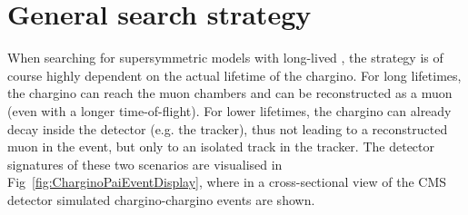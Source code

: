 \section{General search strategy}
\label{sec:GeneralSearchStrategy}

When searching for supersymmetric models with long-lived \chipm, the strategy is of course highly dependent on the actual lifetime of the chargino. 
For long lifetimes, the chargino can reach the muon chambers and can be reconstructed as a muon (even with a longer time-of-flight). 
For lower lifetimes, the chargino can already decay inside the detector (e.g. the tracker), thus not leading to a reconstructed muon in the event, but only to an isolated track in the tracker. 
The detector signatures of these two scenarios are visualised in Fig~\ref{fig:CharginoPaiEventDisplay}, where in a cross-sectional view of the CMS detector simulated chargino-chargino events are shown.

